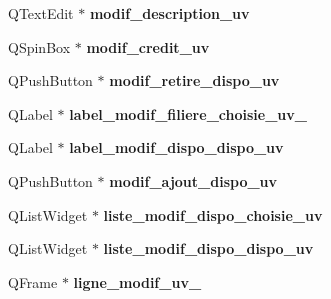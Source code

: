 \begin{DoxyCompactItemize}
\item 
\hypertarget{class_ui___administration_a4cb763685232fc6c33ef5e0c0f133141}{Q\+Text\+Edit $\ast$ {\bfseries modif\+\_\+description\+\_\+uv}}\label{class_ui___administration_a4cb763685232fc6c33ef5e0c0f133141}

\item 
\hypertarget{class_ui___administration_ac18eb1543e30fc7026409b3dccb37a8c}{Q\+Spin\+Box $\ast$ {\bfseries modif\+\_\+credit\+\_\+uv}}\label{class_ui___administration_ac18eb1543e30fc7026409b3dccb37a8c}

\item 
\hypertarget{class_ui___administration_ab252dffda6faaddc366cc2565a2db58c}{Q\+Push\+Button $\ast$ {\bfseries modif\+\_\+retire\+\_\+dispo\+\_\+uv}}\label{class_ui___administration_ab252dffda6faaddc366cc2565a2db58c}

\item 
\hypertarget{class_ui___administration_a23a239d06302905d95b217684086d49b}{Q\+Label $\ast$ {\bfseries label\+\_\+modif\+\_\+filiere\+\_\+choisie\+\_\+uv\+\_}}\label{class_ui___administration_a23a239d06302905d95b217684086d49b}

\item 
\hypertarget{class_ui___administration_aa47d92013e4bf10421b40a8d8a997bc5}{Q\+Label $\ast$ {\bfseries label\+\_\+modif\+\_\+dispo\+\_\+dispo\+\_\+uv}}\label{class_ui___administration_aa47d92013e4bf10421b40a8d8a997bc5}

\item 
\hypertarget{class_ui___administration_a9b9a4a5dafc02e4c41e235e3008f0061}{Q\+Push\+Button $\ast$ {\bfseries modif\+\_\+ajout\+\_\+dispo\+\_\+uv}}\label{class_ui___administration_a9b9a4a5dafc02e4c41e235e3008f0061}

\item 
\hypertarget{class_ui___administration_a4411265ce9c6b4b216a02551807d1f05}{Q\+List\+Widget $\ast$ {\bfseries liste\+\_\+modif\+\_\+dispo\+\_\+choisie\+\_\+uv}}\label{class_ui___administration_a4411265ce9c6b4b216a02551807d1f05}

\item 
\hypertarget{class_ui___administration_ad9198ae52af5b1213f8da2f4210f2add}{Q\+List\+Widget $\ast$ {\bfseries liste\+\_\+modif\+\_\+dispo\+\_\+dispo\+\_\+uv}}\label{class_ui___administration_ad9198ae52af5b1213f8da2f4210f2add}

\item 
\hypertarget{class_ui___administration_a4c95ac308e33656c9f5efce1403b9f14}{Q\+Frame $\ast$ {\bfseries ligne\+\_\+modif\+\_\+uv\+\_}}\label{class_ui___administration_a4c95ac308e33656c9f5efce1403b9f14}


\end{DoxyCompactItemize}
